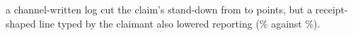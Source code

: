 a channel-written log cut the claim's stand-down from \wtthHaikuHTwoDeltaRZero{} to \wtthHaikuHTwoDeltaROne{} points, but a receipt-shaped line typed by the claimant also lowered reporting (\wtthHaikuPOneForgedPct\% against \wtthHaikuPOneNoReceiptPct\%).
